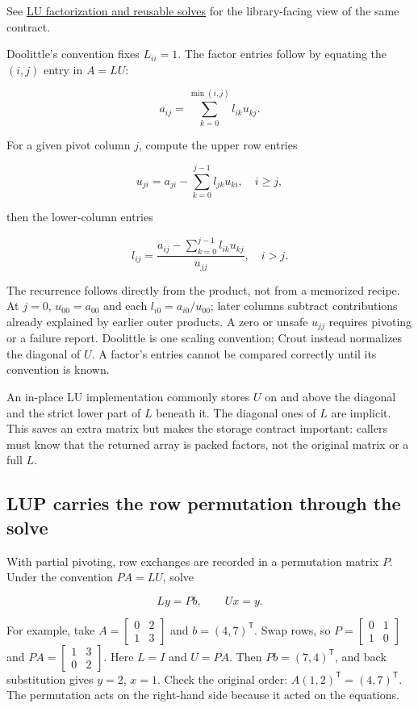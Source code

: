 See \hyperref[01-foundations-i-ch019-a-runnable-pivoted-lu-reference-preserves-the-elimination-history]{LU factorization and reusable solves} for the library-facing view of the same contract.

Doolittle's convention fixes \(L_{ii}=1\). The factor entries follow by equating the \((i,j)\) entry in \(A=LU\):

\[
a_{ij}=\sum_{k=0}^{\min(i,j)} l_{ik}u_{kj}.
\]

For a given pivot column \(j\), compute the upper row entries

\[
u_{ji}=a_{ji}-\sum_{k=0}^{j-1}l_{jk}u_{ki},\quad i\ge j,
\]

then the lower-column entries

\[
l_{ij}=\frac{a_{ij}-\sum_{k=0}^{j-1}l_{ik}u_{kj}}{u_{jj}},\quad i>j.
\]

The recurrence follows directly from the product, not from a memorized recipe. At \(j=0\), \(u_{00}=a_{00}\) and each \(l_{i0}=a_{i0}/u_{00}\); later columns subtract contributions already explained by earlier outer products. A zero or unsafe \(u_{jj}\) requires pivoting or a failure report. Doolittle is one scaling convention; Crout instead normalizes the diagonal of \(U\). A factor's entries cannot be compared correctly until its convention is known.

An in-place LU implementation commonly stores \(U\) on and above the diagonal and the strict lower part of \(L\) beneath it. The diagonal ones of \(L\) are implicit. This saves an extra matrix but makes the storage contract important: callers must know that the returned array is packed factors, not the original matrix or a full \(L\).

\subsection{LUP carries the row permutation through the solve}\label{01-foundations-i-ch019-lup-carries-the-row-permutation-through-the-solve}

\hypertarget{01-foundations-i-ch019-lup-carries-the-row-permutation-through-the-solve}{}

With partial pivoting, row exchanges are recorded in a permutation matrix \(P\). Under the convention \(PA=LU\), solve

\[
Ly=Pb,\qquad Ux=y.
\]

For example, take \(A=\begin{bmatrix}0&2\\1&3\end{bmatrix}\) and \(b=(4,7)^\mathsf T\). Swap rows, so \(P=\begin{bmatrix}0&1\\1&0\end{bmatrix}\) and \(PA=\begin{bmatrix}1&3\\0&2\end{bmatrix}\). Here \(L=I\) and \(U=PA\). Then \(Pb=(7,4)^\mathsf T\), and back substitution gives \(y=2\), \(x=1\). Check the original order: \(A(1,2)^\mathsf T=(4,7)^\mathsf T\). The permutation acts on the right-hand side because it acted on the equations.

